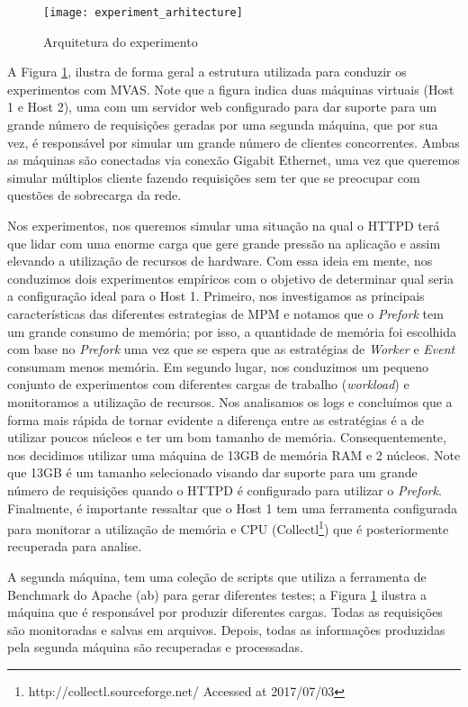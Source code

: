 \begin{figure}[!h]
  \centering
  \texttt{[image: experiment\_arhitecture]}
  \caption{Arquitetura do experimento}
  \label{fig:experiment_architecture}
\end{figure}

A Figura  \ref{fig:experiment_architecture}, ilustra de forma geral a estrutura
utilizada para conduzir os experimentos com MVAS. Note que a figura indica duas
máquinas virtuais (Host 1 e Host 2), uma com um servidor web configurado para
dar suporte para um grande número de requisições geradas por uma segunda
máquina, que por sua vez, é responsável por simular um grande número de
clientes concorrentes. Ambas as máquinas são conectadas via conexão Gigabit
Ethernet, uma vez que queremos simular múltiplos cliente fazendo requisições
sem ter que se preocupar com questões de sobrecarga da rede.

Nos experimentos, nos queremos simular uma situação na qual o HTTPD terá que
lidar com uma enorme carga que gere grande pressão na aplicação e assim
elevando a utilização de recursos de hardware. Com essa ideia em mente, nos
conduzimos dois experimentos empíricos com o objetivo de determinar qual seria
a configuração ideal para o Host 1. Primeiro, nos investigamos as principais
características das diferentes estrategias de MPM e notamos que o
\emph{Prefork} tem um grande consumo de memória; por isso, a quantidade de
memória foi escolhida com base no \emph{Prefork} uma vez que se espera que as
estratégias de \emph{Worker} e \emph{Event} consumam menos memória. Em segundo
lugar, nos conduzimos um pequeno conjunto de experimentos com diferentes cargas
de trabalho (\emph{workload}) e monitoramos a utilização de recursos. Nos
analisamos os logs e concluímos que a forma mais rápida de tornar evidente a
diferença entre as estratégias é a de utilizar poucos núcleos e ter um bom
tamanho de memória. Consequentemente, nos decidimos utilizar uma máquina de
13GB de memória RAM e 2 núcleos. Note que 13GB é um tamanho selecionado visando
dar suporte para um grande número de requisições quando o HTTPD é configurado
para utilizar o \emph{Prefork}. Finalmente, é importante ressaltar que o Host 1
tem uma ferramenta configurada para monitorar a utilização de memória e CPU
(Collectl\footnote{http://collectl.sourceforge.net/ Accessed at 2017/07/03})
que é posteriormente recuperada para analise.

A segunda máquina, tem uma coleção de scripts que utiliza a ferramenta de
Benchmark do Apache (ab) para gerar diferentes testes; a Figura
\ref{fig:experiment_architecture} ilustra a máquina que é responsável por
produzir diferentes cargas. Todas as requisições são monitoradas e salvas em
arquivos. Depois, todas as informações produzidas pela segunda máquina são
recuperadas e processadas.

